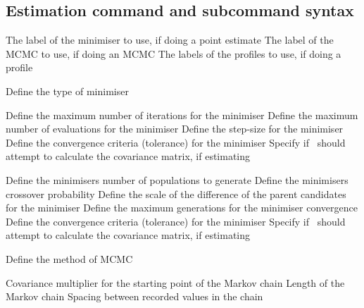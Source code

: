 \subsection{Estimation command and subcommand syntax}\par
{}\par\par
{} {The label of the minimiser to use, if doing a point estimate}
 {The label of the MCMC to use, if doing an MCMC}
 {The labels of the profiles to use, if doing a profile}
\par{}\par\par
{} {Define the type of minimiser}
\par\textbf{}\par
{} {Define the maximum number of iterations for the minimiser}
 {Define the maximum number of evaluations for the minimiser}
 {Define the step-size for the minimiser}
 {Define the convergence criteria (tolerance) for the minimiser}
 {Specify if \SPM\ should attempt to calculate the covariance matrix, if estimating}
\par\textbf{}\par
{} {Define the minimisers number of populations to generate}
 {Define the minimisers crossover probability }
 {Define the scale of the difference of the parent candidates for the minimiser}
 {Define the maximum generations for the minimiser convergence}
 {Define the convergence criteria (tolerance) for the minimiser}
 {Specify if \SPM\ should attempt to calculate the covariance matrix, if estimating}
\par{}\par\par
{} {Define the method of MCMC}
\par\textbf{}\par
{} {Covariance multiplier for the starting point of the Markov chain}
 {Length of the Markov chain}
 {Spacing between recorded values in the chain}
